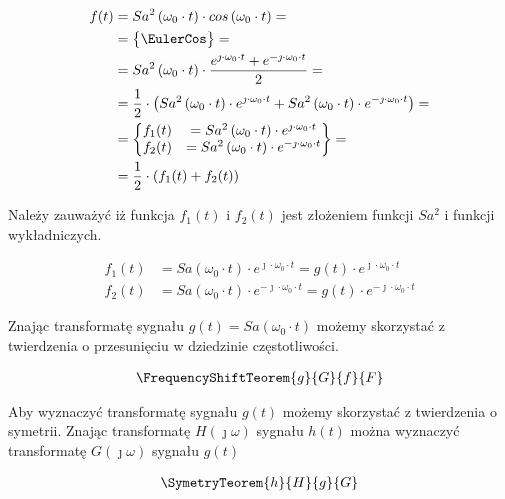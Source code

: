 \begin{task}
\begin{align*}
f(t) &= Sa^2\left(\omega_0 \cdot t\right) \cdot cos\left(\omega_0 \cdot t\right)=\\
&=\begin{Bmatrix}
\EulerCos
\end{Bmatrix}=\\
&= Sa^2\left(\omega_0 \cdot t\right) \cdot \frac{e^{\jmath \cdot \omega_0 \cdot t} + e^{-\jmath \cdot \omega_0 \cdot t}}{2}=\\
&= \frac{1}{2} \cdot \left( Sa^2\left(\omega_0 \cdot t\right) \cdot e^{\jmath \cdot \omega_0 \cdot t} + Sa^2\left(\omega_0 \cdot t\right) \cdot e^{-\jmath \cdot \omega_0 \cdot t} \right)=\\
&=\begin{Bmatrix}
f_1(t) &= Sa^2\left(\omega_0 \cdot t\right) \cdot e^{\jmath \cdot \omega_0 \cdot t} \\
f_2(t) &= Sa^2\left(\omega_0 \cdot t\right) \cdot e^{-\jmath \cdot \omega_0 \cdot t}
\end{Bmatrix}=\\
&=\frac{1}{2} \cdot \left(f_1(t) + f_2(t) \right)
\end{align*}

Należy zauważyć iż funkcja $f_1(t)$ i $f_2(t)$ jest złożeniem funkcji $Sa^2$ i funkcji wykładniczych.

\begin{align*}
f_1(t) &= Sa\left(\omega_0 \cdot t\right) \cdot e^{\jmath \cdot \omega_0 \cdot t} = g(t)\cdot e^{\jmath \cdot \omega_0 \cdot t}\\
f_2(t) &= Sa\left(\omega_0 \cdot t\right) \cdot e^{-\jmath \cdot \omega_0 \cdot t} = g(t) \cdot e^{-\jmath \cdot \omega_0 \cdot t}
\end{align*}

Znając transformatę sygnału $g(t) = Sa\left(\omega_0 \cdot t\right)$ możemy skorzystać z twierdzenia o przesunięciu w dziedzinie częstotliwości. 

\begin{align*}
\FrequencyShiftTeorem{g}{G}{f}{F}
\end{align*}

Aby wyznaczyć transformatę sygnału $g(t)$ możemy skorzystać z twierdzenia o symetrii. Znając transformatę $H(\jmath \omega)$ sygnału $h(t)$ można wyznaczyć transformatę $G(\jmath \omega)$ sygnału $g(t)$

\begin{align*}
\SymetryTeorem{h}{H}{g}{G}
\end{align*}


\end{task}
